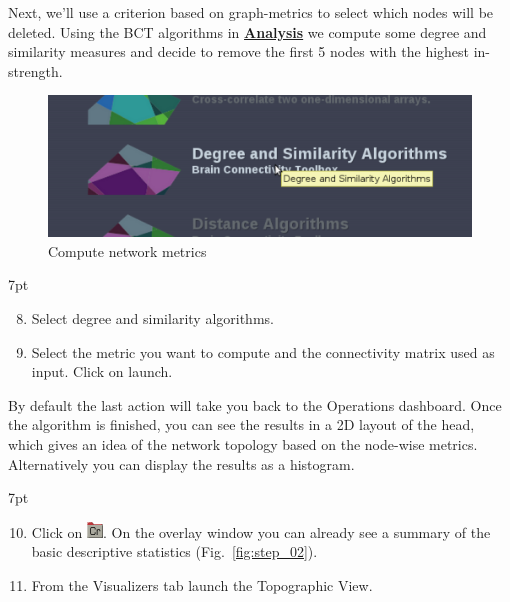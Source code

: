 \documentclass{tufte-handout}
\newenvironment{formal}{%
  \def\FrameCommand{%
    \hspace{1pt}%
    {\color{DarkBlue}\vrule width 2pt}%
    {\color{formalshade}\vrule width 4pt}%
    \colorbox{formalshade}%
  }%
  \MakeFramed{\advance\hsize-\width\FrameRestore}%
  \noindent\hspace{-4.55pt}%
  \begin{adjustwidth}{}{7pt}%
  \vspace{2pt}\vspace{2pt}%
}
{%
  \vspace{2pt}\end{adjustwidth}\endMakeFramed%
}
\begin{document}
\noindent Next, we'll use a criterion based on graph-metrics to select which
nodes will be deleted. Using the BCT 
algorithms in \underline{\textbf{Analysis}} we compute some degree and
similarity measures and decide to remove the first 5 nodes with the highest
in-strength.


\begin{figure}[h]
  \includegraphics[width=\linewidth]{Handout_UI_ModellingStructuralLesions_Analysis}%
  \caption{Compute network metrics}%
  \label{fig:step_01}%
\end{figure}

\begin{formal}
  \begin{enumerate}[resume]
  \setcounter{enumi}{7}
  \item Select degree and similarity algorithms. 
  \item Select the metric you want to compute and the connectivity matrix used as input. Click on launch. 
  \end{enumerate}
\end{formal}


\noindent By default the last action will take you back to the Operations dashboard.
Once the algorithm is finished, you can see the results in a 2D layout of the
head, which gives an idea of the network topology based on the node-wise
metrics. Alternatively you can display the results as a histogram. 

\begin{formal}
  \begin{enumerate}[resume]
  \setcounter{enumi}{9}
  \item Click on \includegraphics[width=0.042\linewidth]{nodeConnectivityMeasure}. On
  the overlay window you can already see a summary of the basic descriptive
  statistics (Fig.~\ref{fig:step_02}).

  \item From the Visualizers tab launch the Topographic View.
  \end{enumerate}
\end{formal}
\end{document}
